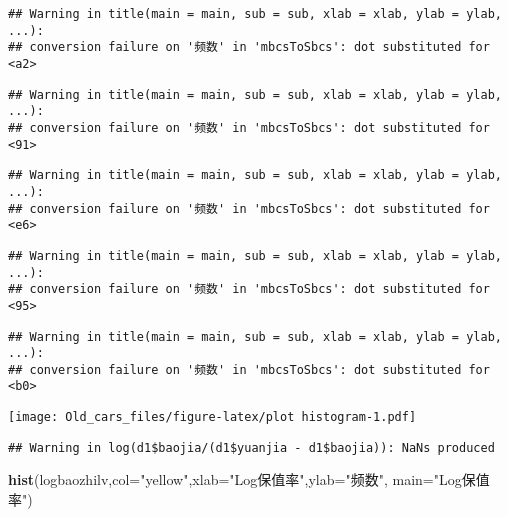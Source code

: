 \documentclass[]{article}
\newenvironment{Shaded}{\begin{snugshade}}{\end{snugshade}}
\newcommand{\KeywordTok}[1]{\textcolor[rgb]{0.13,0.29,0.53}{\textbf{#1}}}
\newcommand{\DataTypeTok}[1]{\textcolor[rgb]{0.13,0.29,0.53}{#1}}
\newcommand{\StringTok}[1]{\textcolor[rgb]{0.31,0.60,0.02}{#1}}
\newcommand{\OperatorTok}[1]{\textcolor[rgb]{0.81,0.36,0.00}{\textbf{#1}}}
\newcommand{\NormalTok}[1]{#1}
\begin{document}
\begin{verbatim}
## Warning in title(main = main, sub = sub, xlab = xlab, ylab = ylab, ...):
## conversion failure on '频数' in 'mbcsToSbcs': dot substituted for <a2>
\end{verbatim}

\begin{verbatim}
## Warning in title(main = main, sub = sub, xlab = xlab, ylab = ylab, ...):
## conversion failure on '频数' in 'mbcsToSbcs': dot substituted for <91>
\end{verbatim}

\begin{verbatim}
## Warning in title(main = main, sub = sub, xlab = xlab, ylab = ylab, ...):
## conversion failure on '频数' in 'mbcsToSbcs': dot substituted for <e6>
\end{verbatim}

\begin{verbatim}
## Warning in title(main = main, sub = sub, xlab = xlab, ylab = ylab, ...):
## conversion failure on '频数' in 'mbcsToSbcs': dot substituted for <95>
\end{verbatim}

\begin{verbatim}
## Warning in title(main = main, sub = sub, xlab = xlab, ylab = ylab, ...):
## conversion failure on '频数' in 'mbcsToSbcs': dot substituted for <b0>
\end{verbatim}

\texttt{[image: Old\_cars\_files/figure-latex/plot histogram-1.pdf]}

\begin{Shaded}
\end{Shaded}

\begin{verbatim}
## Warning in log(d1$baojia/(d1$yuanjia - d1$baojia)): NaNs produced
\end{verbatim}

\begin{Shaded}
\begin{Highlighting}[]
\KeywordTok{hist}\NormalTok{(logbaozhilv,}\DataTypeTok{col=}\StringTok{"yellow"}\NormalTok{,}\DataTypeTok{xlab=}\StringTok{"Log保值率"}\NormalTok{,}\DataTypeTok{ylab=}\StringTok{"频数"}\NormalTok{, }\DataTypeTok{main=}\StringTok{"Log保值率"}\NormalTok{)}
\end{Highlighting}
\end{Shaded}
\end{document}
